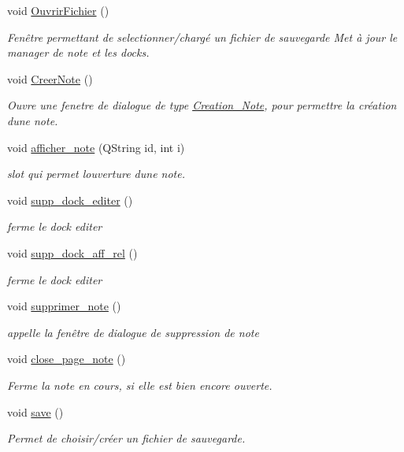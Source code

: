 \begin{DoxyCompactItemize}
void \hyperlink{classinterface_af42d8f6426ad19ce13f1dd2ce9f519c1}{Ouvrir\+Fichier} ()
\begin{DoxyCompactList}\small\item\em Fenêtre permettant de selectionner/chargé un fichier de sauvegarde Met à jour le manager de note et les docks. \end{DoxyCompactList}\item 
void \hyperlink{classinterface_a23957135caad59d8850fe8e2cbee28a3}{Creer\+Note} ()
\begin{DoxyCompactList}\small\item\em Ouvre une fenetre de dialogue de type \hyperlink{class_creation___note}{Creation\+\_\+\+Note}, pour permettre la création d\textquotesingle{}une note. \end{DoxyCompactList}\item 
void \hyperlink{classinterface_a320051a7a36aa24f53b12df82649f15f}{afficher\+\_\+note} (Q\+String id, int i)
\begin{DoxyCompactList}\small\item\em slot qui permet l\textquotesingle{}ouverture d\textquotesingle{}une note. \end{DoxyCompactList}\item 
\mbox{\label{classinterface_a3144306293774f567cbe90fa90cfd796}} 
void \hyperlink{classinterface_a3144306293774f567cbe90fa90cfd796}{supp\+\_\+dock\+\_\+editer} ()
\begin{DoxyCompactList}\small\item\em ferme le dock editer \end{DoxyCompactList}\item 
\mbox{\label{classinterface_a4c1879f0b3b09843bb3506f35bd1217b}} 
void \hyperlink{classinterface_a4c1879f0b3b09843bb3506f35bd1217b}{supp\+\_\+dock\+\_\+aff\+\_\+rel} ()
\begin{DoxyCompactList}\small\item\em ferme le dock editer \end{DoxyCompactList}\item 
void \hyperlink{classinterface_aca23c755ba40ca8198010ff0487b22a8}{supprimer\+\_\+note} ()
\begin{DoxyCompactList}\small\item\em appelle la fenêtre de dialogue de suppression de note \end{DoxyCompactList}\item 
void \hyperlink{classinterface_abe2464522932a5d8ed76d1ba02c9d2c6}{close\+\_\+page\+\_\+note} ()
\begin{DoxyCompactList}\small\item\em Ferme la note en cours, si elle est bien encore ouverte. \end{DoxyCompactList}\item 
void \hyperlink{classinterface_a319f133949e2be97a203f725c3f1e565}{save} ()
\begin{DoxyCompactList}\small\item\em Permet de choisir/créer un fichier de sauvegarde. \end{DoxyCompactList}\end{DoxyCompactItemize}
